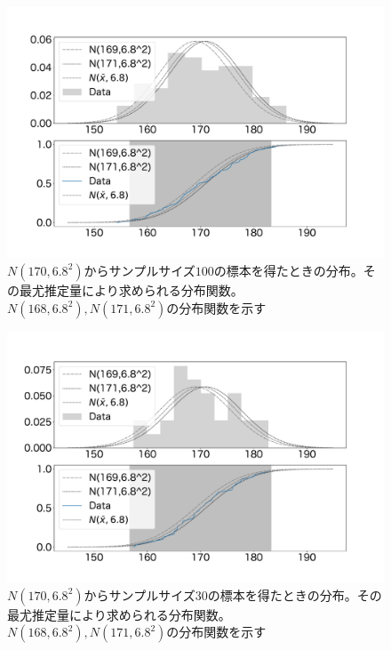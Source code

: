 \begin{figure}
    \begin{center}
        \includegraphics[width=15cm]{./image/02_/maximum_likelihood_0.pdf}
        \caption{$N(170,6.8^2)$からサンプルサイズ$100$の標本を得たときの分布。その最尤推定量により求められる分布関数。$N(168,6.8^2),N(171,6.8^2)$の分布関数を示す}
        \label{fig:maximum_likelihood_0}
    \end{center}
\end{figure}
\begin{figure}
    \begin{center}
        \includegraphics[width=15cm]{./image/02_/maximum_likelihood_1.pdf}
        \caption{$N(170,6.8^2)$からサンプルサイズ$30$の標本を得たときの分布。その最尤推定量により求められる分布関数。$N(168,6.8^2),N(171,6.8^2)$の分布関数を示す}
        \label{fig:maximum_likelihood_1}
    \end{center}
\end{figure}

